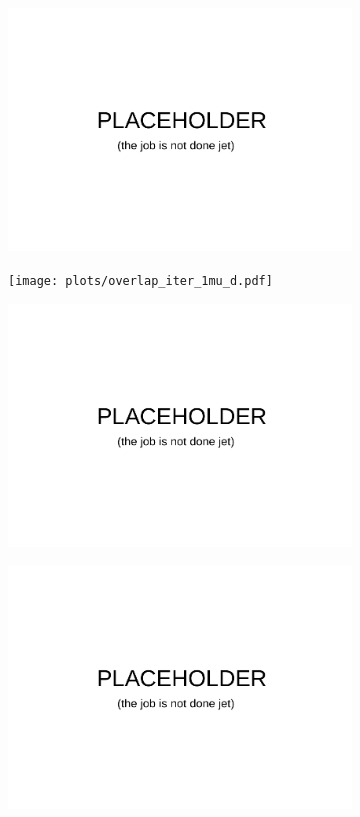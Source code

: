 \begin{figure}
    \centering
    \begin{subfigure}{0.5\textwidth}
    \includegraphics[width=0.8\linewidth]{plots/placeholder.pdf}
    \end{subfigure}%
    \begin{subfigure}{0.5\textwidth}
    \texttt{[image: plots/overlap\_iter\_1mu\_d.pdf]}
    \end{subfigure}
    \begin{subfigure}{0.5\textwidth}
    \includegraphics[width=0.8\linewidth]{plots/placeholder.pdf}
    \end{subfigure}%
    \begin{subfigure}{0.5\textwidth}
    \includegraphics[width=0.8\linewidth]{plots/placeholder.pdf}

\end{subfigure}
\end{figure}
